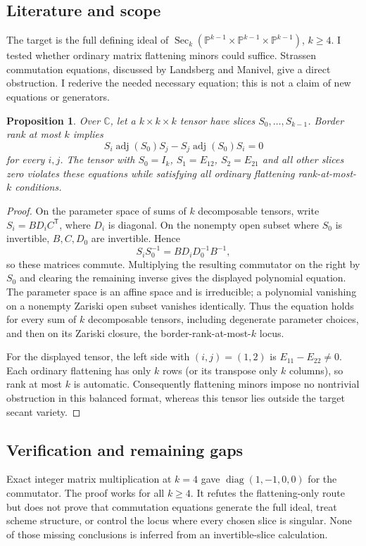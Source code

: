\documentclass[11pt]{article}
\newtheorem{proposition}{Proposition}
\begin{document}
\subsection{Literature and scope}
The target is the full defining ideal of $\operatorname{Sec}_k(\mathbb P^{k-1}\times\mathbb P^{k-1}\times\mathbb P^{k-1})$, $k\ge4$. I tested whether ordinary matrix flattening minors could suffice. Strassen commutation equations, discussed by Landsberg and Manivel, give a direct obstruction. I rederive the needed necessary equation; this is not a claim of new equations or generators.
\begin{proposition}
Over $\mathbb C$, let a $k\times k\times k$ tensor have slices $S_0,\ldots,S_{k-1}$. Border rank at most $k$ implies
\[
S_i\operatorname{adj}(S_0)S_j-S_j\operatorname{adj}(S_0)S_i=0
\]
for every $i,j$. The tensor with $S_0=I_k$, $S_1=E_{12}$, $S_2=E_{21}$ and all other slices zero violates these equations while satisfying all ordinary flattening rank-at-most-$k$ conditions.
\end{proposition}
\begin{proof}
On the parameter space of sums of $k$ decomposable tensors, write $S_i=B D_i C^{\mathsf T}$, where $D_i$ is diagonal. On the nonempty open subset where $S_0$ is invertible, $B,C,D_0$ are invertible. Hence
\[
S_iS_0^{-1}=B D_iD_0^{-1}B^{-1},
\]
so these matrices commute. Multiplying the resulting commutator on the right by $S_0$ and clearing the remaining inverse gives the displayed polynomial equation. The parameter space is an affine space and is irreducible; a polynomial vanishing on a nonempty Zariski open subset vanishes identically. Thus the equation holds for every sum of $k$ decomposable tensors, including degenerate parameter choices, and then on its Zariski closure, the border-rank-at-most-$k$ locus.

For the displayed tensor, the left side with $(i,j)=(1,2)$ is $E_{11}-E_{22}\ne0$. Each ordinary flattening has only $k$ rows (or its transpose only $k$ columns), so rank at most $k$ is automatic. Consequently flattening minors impose no nontrivial obstruction in this balanced format, whereas this tensor lies outside the target secant variety.
\end{proof}
\subsection{Verification and remaining gaps}
Exact integer matrix multiplication at $k=4$ gave $\operatorname{diag}(1,-1,0,0)$ for the commutator. The proof works for all $k\ge4$. It refutes the flattening-only route but does not prove that commutation equations generate the full ideal, treat scheme structure, or control the locus where every chosen slice is singular. None of those missing conclusions is inferred from an invertible-slice calculation.
\end{document}
